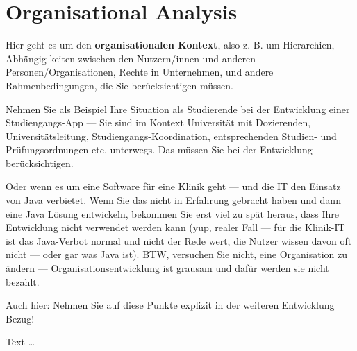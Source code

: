 \documentclass[11pt,a4paper,english]{scrreprt}
\newenvironment{comment}
  {\par\medskip
   \begingroup\color{olive}%
   }
 {\endgroup
  \medskip}
\begin{document}
\section{Organisational Analysis}
\begin{comment}
Hier geht es um den \textbf{organisationalen Kontext}, also z. B. um Hierarchien, Abhängig-keiten zwischen den Nutzern/innen und anderen Personen/Organisationen, Rechte in Unternehmen, und andere Rahmenbedingungen, die Sie berücksichtigen müssen.

Nehmen Sie als Beispiel Ihre Situation als Studierende bei der Entwicklung einer Studiengangs-App — Sie sind im Kontext Universität mit Dozierenden, Universitätsleitung, Studiengangs-Koordination, entsprechenden Studien- und Prüfungsordnungen etc. unterwegs. Das müssen Sie bei der Entwicklung berücksichtigen.

Oder wenn es um eine Software für eine Klinik geht — und die IT den Einsatz von Java verbietet. Wenn Sie das nicht in Erfahrung gebracht haben und dann eine Java Lösung entwickeln, bekommen Sie erst viel zu spät heraus, dass Ihre Entwicklung nicht verwendet werden kann (yup, realer Fall — für die Klinik-IT ist das Java-Verbot normal und nicht der Rede wert, die Nutzer wissen davon oft nicht — oder gar was Java ist). BTW, versuchen Sie nicht, eine Organisation zu ändern — Organisationsentwicklung ist grausam und dafür werden sie nicht bezahlt.

Auch hier: Nehmen Sie auf diese Punkte explizit in der weiteren Entwicklung Bezug!
\end{comment}

Text \dots
\end{document}
